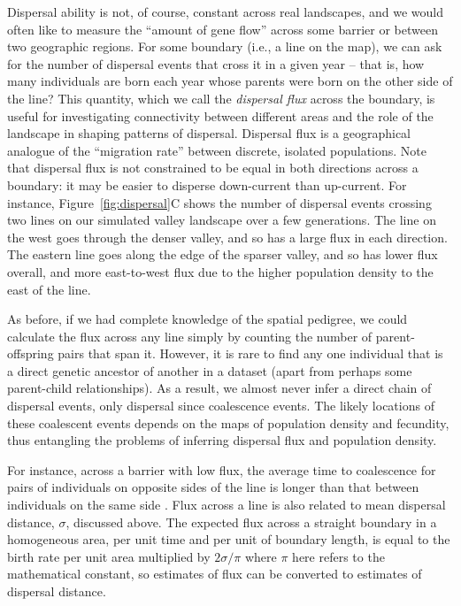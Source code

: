 \documentclass{ar-1col}
\renewcommand{\emph}[1]{{\textit{#1}}}
\begin{document}
Dispersal ability is not, of course, constant across real landscapes, and
we would often like to measure the ``amount of gene flow'' across some barrier
or between two geographic regions.
For some boundary (i.e., a line on the map),
we can ask for the number of dispersal events that cross it in a given year -- 
that is, 
how many individuals are born each year whose parents
were born on the other side of the line?
This quantity, which we call the \emph{dispersal flux} across the boundary,
is useful for investigating connectivity between different areas
and the role of the landscape in shaping patterns of dispersal.
Dispersal flux is a geographical analogue of
the ``migration rate'' between discrete, isolated populations. 
Note that dispersal flux is not constrained to be equal in both directions across a boundary:
it may be easier to disperse down-current than up-current.
For instance, Figure~\ref{fig:dispersal}C
shows the number of dispersal events crossing two lines on our simulated valley landscape
over a few generations.
The line on the west goes through the denser valley, 
and so has a large flux in each direction.
The eastern line goes along the edge of the sparser valley,
and so has lower flux overall, and more east-to-west flux
due to the higher population density to the east of the line.

As before, if we had complete knowledge of the spatial pedigree,
we could calculate the flux across any line simply by counting the number of
parent-offspring pairs that span it.
However, it is rare to find any one individual
that is a direct genetic ancestor of another in a dataset
(apart from perhaps some parent-child relationships).
As a result, we almost never infer a direct chain of dispersal events,
only dispersal since coalescence events.
The likely locations of these coalescent events
depends on the maps of population density and fecundity,
thus entangling
the problems of inferring dispersal flux and population density.

For instance, across a barrier with low flux,
the average time to coalescence for pairs of individuals on opposite sides of the line
is longer than that between individuals on the same side \citep{bedassle,Duforet-Frebourg_Blum_2014,ringbauer2018estimating}.
Flux across a line is also related to mean dispersal distance, $\sigma$, discussed above.
The expected flux across a straight boundary in a homogeneous area,
per unit time and per unit of boundary length,
is equal to the birth rate per unit area multiplied by $2 \sigma / \pi$
\citep{buffon1777}
where $\pi$ here refers to the mathematical constant,
so estimates of flux can be converted to estimates of dispersal distance.
\end{document}
